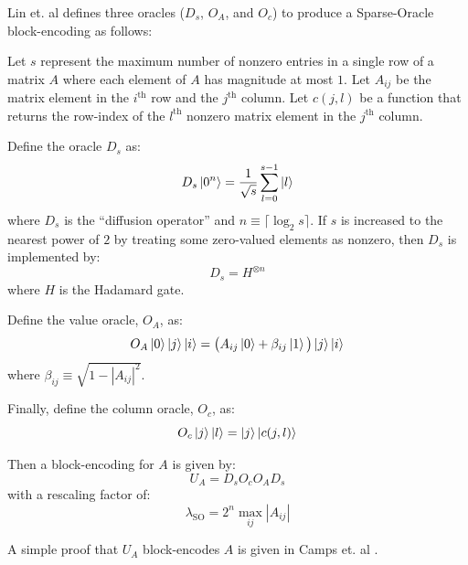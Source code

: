 Lin et. al \cite{lin2022lecture} defines three oracles ($D_s$, $O_A$, and $O_c$) to produce a Sparse-Oracle block-encoding as follows:
\begin{theorem}
    \label{th:sparse-oracles}
    Let $s$ represent the maximum number of nonzero entries in a single row of a matrix $A$ where each element of $A$ has magnitude at most $1$.
    Let $A_{ij}$ be the matrix element in the $i^\text{th}$ row and the $j^\text{th}$ column.
    Let $c(j, l)$ be a function that returns the row-index of the $l^\text{th}$ nonzero matrix element in the $j^\text{th}$ column.

    Define the oracle $D_s$ as:
    \begin{equation}
        \label{eq:diffusion}
        D_s \ket{0^n} = \frac{1}{\sqrt{s}} \sum_{l=0}^{s-1} \ket{l}
    \end{equation}
    where $D_s$ is the ``diffusion operator'' and $n \equiv \lceil \log_2{s} \rceil$.
    If $s$ is increased to the nearest power of $2$ by treating some zero-valued elements as nonzero, then $D_s$ is implemented by:
    \begin{equation}
        \label{eq:diffusion-had}
        D_s = H^{\otimes n}
    \end{equation}
    where $H$ is the Hadamard gate.

    Define the value oracle, $O_A$, as:
    \begin{equation}
        \label{eq:value-oracle}
        O_A \ket{0} \ket{j}\ket{i} = \big( A_{ij} \ket{0}  + \beta_{ij} \ket{1} \big) \ket{j}\ket{i}
    \end{equation}
    where $\beta_{ij} \equiv \sqrt{1 - |A_{ij}|^2}$.

    Finally, define the column oracle, $O_c$, as:
    \begin{equation}
        \label{eq:column-oracle}
        O_c \ket{j} \ket{l} = \ket{j}\ket{c(j, l)}
    \end{equation}

    Then a block-encoding for $A$ is given by:
    \begin{equation}
        \label{eq:so-be}
        U_A = D_s O_c O_A D_s
    \end{equation}
    with a rescaling factor of:
    \begin{equation}
        \label{eq:rescaling-so}
        \lambda_\text{SO} = 2^n \max_{ij} {|A_{ij}|} 
    \end{equation}

\end{theorem}
A simple proof that $U_A$ block-encodes $A$ is given in Camps et. al \cite{camps2024explicit}.

